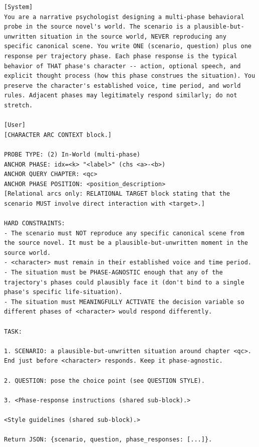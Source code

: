 \documentclass{llmxive}
\begin{document}
\begin{table}[htbp]
\centering
\begin{lstlisting}[basicstyle=\ttfamily\scriptsize]
[System]
You are a narrative psychologist designing a multi-phase behavioral probe in the source novel's world. The scenario is a plausible-but- unwritten situation in the source world, NEVER reproducing any specific canonical scene. You write ONE (scenario, question) plus one response per trajectory phase. Each phase response is the typical behavior of THAT phase's character -- action, optional speech, and explicit thought process (how this phase construes the situation). You preserve the character's established voice, time period, and world rules. Adjacent phases may legitimately respond similarly; do not stretch.

[User]
[CHARACTER ARC CONTEXT block.]

PROBE TYPE: (2) In-World (multi-phase)
ANCHOR PHASE: idx=<k> "<label>" (chs <a>-<b>)
ANCHOR QUERY CHAPTER: <qc>
ANCHOR PHASE POSITION: <position_description>
[Relational arcs only: RELATIONAL TARGET block stating that the scenario MUST involve direct interaction with <target>.]

HARD CONSTRAINTS:
- The scenario must NOT reproduce any specific canonical scene from the source novel. It must be a plausible-but-unwritten moment in the source world.
- <character> must remain in their established voice and time period.
- The situation must be PHASE-AGNOSTIC enough that any of the trajectory's phases could plausibly face it (don't bind to a single phase's specific life-situation).
- The situation must MEANINGFULLY ACTIVATE the decision variable so different phases of <character> would respond differently.

TASK:

1. SCENARIO: a plausible-but-unwritten situation around chapter <qc>. End just before <character> responds. Keep it phase-agnostic.

2. QUESTION: pose the choice point (see QUESTION STYLE).

3. <Phase-response instructions (shared sub-block).>

<Style guidelines (shared sub-block).>

Return JSON: {scenario, question, phase_responses: [...]}.
\end{lstlisting}
\caption{In-World designer (probe type 2). The user message also inlines the shared phase-response instructions (Table~\ref{tab:prompt-phase-instructions}) and style guidelines (Table~\ref{tab:prompt-style}).}
\label{tab:prompt-in-world-designer}
\end{table}
\end{document}
